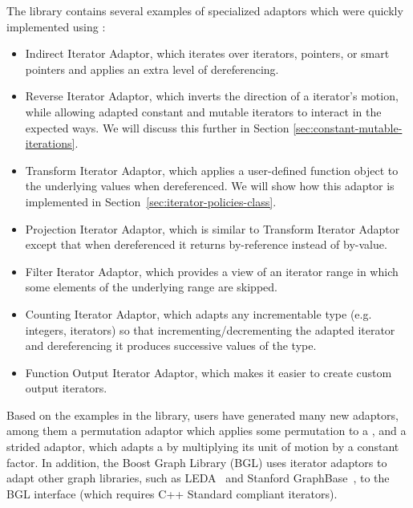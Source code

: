\documentclass{netobjectdays}
\newcommand{\iteratoradaptor}{\code{iterator\_\-adaptor}}
\begin{document}
The library contains several examples of specialized adaptors which
were quickly implemented using \iteratoradaptor{}:\begin{itemize}

 \item Indirect Iterator Adaptor, which iterates over iterators, pointers, or
smart pointers and applies an extra level of dereferencing.

 \item Reverse Iterator Adaptor, which inverts the direction of a
 iterator's motion, while allowing adapted constant and
mutable iterators to interact in the expected ways. We will discuss
this further in Section \ref{sec:constant-mutable-iterations}.

 \item Transform Iterator Adaptor, which applies a user-defined
function object to the underlying values when dereferenced. We will
show how this adaptor is implemented in
Section~\ref{sec:iterator-policies-class}.

 \item Projection Iterator Adaptor, which is similar to Transform
Iterator Adaptor except that when dereferenced it returns by-reference
instead of by-value.

 \item Filter Iterator Adaptor, which provides a view of an iterator
 range in which some elements of the underlying range are skipped.

 \item Counting Iterator Adaptor, which adapts any incrementable type
(e.g. integers, iterators) so that incrementing/decrementing the
adapted iterator and dereferencing it produces successive values of
the  type.

 \item Function Output Iterator Adaptor, which makes it easier to
create custom output iterators.

\end{itemize}

Based on the examples in the library, users have generated many new
adaptors, among them a permutation adaptor which applies some
permutation to a , and a strided
adaptor, which adapts a  by
multiplying its unit of motion by a constant factor.  In addition, the
Boost Graph Library (BGL) uses iterator adaptors to adapt other graph
libraries, such as LEDA~\cite{mehlhorn99:_leda} and Stanford
GraphBase~\cite{knu94:sgb}, to the BGL interface (which requires C++
Standard compliant iterators).
\end{document}
